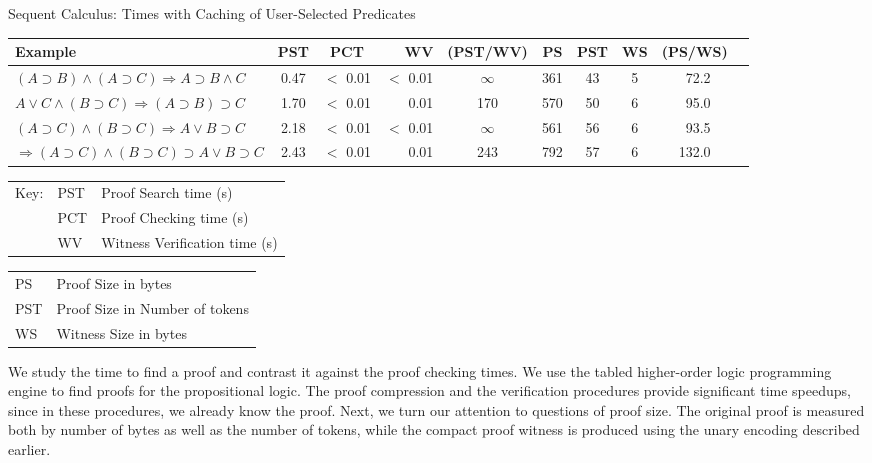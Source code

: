 \documentclass{llncs}
\begin{document}
\begin{center}
Sequent Calculus: Times with Caching of User-Selected Predicates
\begin{small}
\begin{tabular}{|l|c|c|r|c|c|c|c|c|r|}
\hline
Example & PST & PCT & WV & (PST/WV) & PS & PST & WS & (PS/WS)\\
\hline
$(A\supset B)\wedge (A\supset C)\Rightarrow A\supset B\wedge C$
&       0.47 
&     $<$ 0.01
&     $<$  0.01 
& $\infty$
&       361 
&       43 
&       5 
&       \ 72.2\\
$A\vee C\wedge (B\supset C)\Rightarrow (A\supset B)\supset C$
&       1.70 
&      $<$ 0.01
&       0.01
&       170 
&       570 
&       50 
&       6 
&       \ 95.0\\
$(A\supset C)\wedge (B\supset C)\Rightarrow A\vee B\supset C$
&       2.18 
&      $<$ 0.01
&      $<$ 0.01
&      $\infty$ 
&       561 
&       56 
&       6 
&       \ 93.5\\
$\Rightarrow (A\supset C)\wedge (B\supset C)\supset A\vee B\supset C$
&       2.43 
&      $<$ 0.01
&      \ \ 0.01
&       243 
&       792 
&       57 
&       6 
&       132.0\\
\hline
\end{tabular}
\begin{tabular}{ll@{=}l}
Key: & PST & Proof Search time (s)\\
&PCT & Proof Checking time (s)\\ 
&WV & Witness Verification time (s)
\end{tabular} 
\begin{tabular}{l@{=}l}
PS & Proof Size in bytes\\
PST & Proof Size in Number of tokens \\
WS & Witness Size in bytes\\
\end{tabular} 
\end{small}
\end{center}

We study the time to find a proof and contrast it against the proof
checking times. We use the tabled higher-order logic programming
engine \cite{Pientka05,Pientka03phd} to find proofs for the
propositional logic. The proof compression and the verification procedures
provide significant time speedups, since in these procedures, we already
know the proof. %
Next, we turn our attention to questions of proof size.
The original proof is measured both by number of bytes as well as the
number of tokens, while the compact proof witness is produced using
the unary encoding described earlier.  
\end{document}
